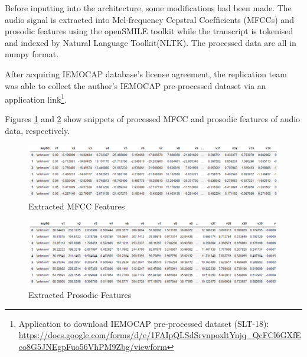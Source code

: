 \documentclass{article}
\begin{document}
    Before inputting into the architecture, some modifications had been made. The audio signal is extracted into Mel-frequency Cepstral Coefﬁcients (MFCCs) and prosodic features using the openSMILE toolkit while the transcript is tokenised and indexed by Natural Language Toolkit(NLTK). The processed data are all in numpy format.\par
    
    After acquiring IEMOCAP database's license agreement, the replication team was able to collect the author's IEMOCAP pre-processed dataset via an application link\footnote{Application to download IEMOCAP pre-processed dataset (SLT-18):\\  \url{https://docs.google.com/forms/d/e/1FAIpQLSdSrvnpoxltYnjq_QcFCl6GXfEco8G5JNEgpFuo56VhPM9Zbg/viewform}}.\par
    
    Figures \ref{fig:Extracted MFCC features} and \ref{fig:Extracted Prosodic features} show snippets of processed MFCC and prosodic features of audio data, respectively.\par
    
    \begin{figure}[H]
        \centering
        \includegraphics[width=12cm]{Images/mfcc.PNG}
        \caption{Extracted MFCC Features}
        \label{fig:Extracted MFCC features}
    \end{figure}
    
    \begin{figure}[H]
        \centering
        \includegraphics[width=12cm]{Images/prosody.PNG}
        \caption{Extracted Prosodic Features}
        \label{fig:Extracted Prosodic features}
    \end{figure}
    
\end{document}
